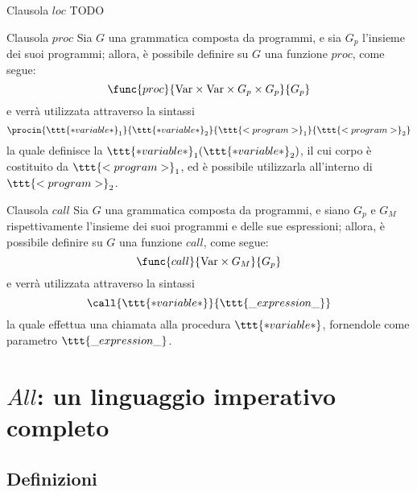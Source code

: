 \documentclass[a4paper, 12pt]{report}
\begin{document}
    \begin{frameddefn}{Clausola $loc$}
        TODO
    \end{frameddefn}

    \begin{frameddefn}{Clausola $proc$}
        Sia $G$ una grammatica composta da programmi, e sia $G_p$ l'insieme dei suoi programmi; allora, è possibile definire su $G$ una funzione $proc$, come segue: $$\func{proc}{\mathrm{Var} \times \mathrm{Var} \times G_p \times G_p}{G_p}$$ e verrà utilizzata attraverso la sintassi $$\procin{\ttt{*variable*}_1}{\ttt{*variable*}_2}{\ttt{<program>}_1}{\ttt{<program>}_2}$$ la quale definisce la  $\ttt{*variable*}_1(\ttt{*variable*}_2)$, il cui corpo è costituito da $\ttt{<program>}_1$, ed è possibile utilizzarla all'interno di $\ttt{<program>}_2$.
    \end{frameddefn}

    \begin{frameddefn}{Clausola $call$}
        Sia $G$ una grammatica composta da programmi, e siano $G_p$ e $G_M$ rispettivamente l'insieme dei suoi programmi e delle sue espressioni; allora, è possibile definire su $G$ una funzione $call$, come segue: $$\func{call}{\mathrm{Var} \times G_M}{G_p}$$ e verrà utilizzata attraverso la sintassi $$\call{\ttt{*variable*}}{\ttt{\_expression\_}}$$ la quale effettua una chiamata alla procedura $\ttt{*variable*}$, fornendole come parametro $\ttt{\_expression\_}$.
    \end{frameddefn}

    \section{$All$: un linguaggio imperativo completo}

    \subsection{Definizioni}
\end{document}
